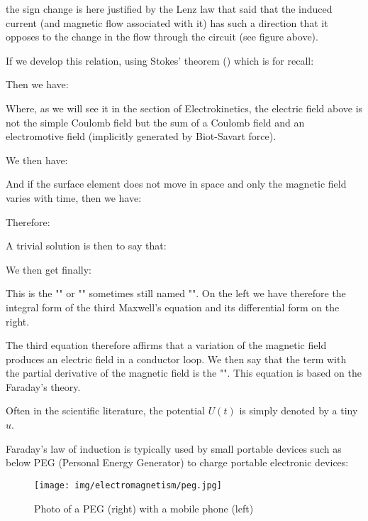 	the sign change is here justified by the Lenz law that said that the induced current (and magnetic flow associated with it) has such a direction that it opposes to the change in the flow through the circuit (see figure above).
	
	If we develop this relation, using Stokes' theorem () which is for recall:
	
	Then we have:
	
	Where, as we will see it in the section of Electrokinetics, the electric field above is not the simple Coulomb field but the sum of a Coulomb field and an electromotive field (implicitly generated by Biot-Savart force).
	
	We then have:
	
	And if the surface element does not move in space and only the magnetic field varies with time, then we have:
	
	Therefore:
	
	A trivial solution is then to say that:
	
	We then get finally:
	
	This is the "" or "" sometimes still named "". On the left we have therefore the integral form of the third Maxwell's equation and its differential form on the right.
	
	The third equation therefore affirms that a variation of the magnetic field produces an electric field in a conductor loop. We then say that the term with the partial derivative of the magnetic field is the "". This equation is based on the Faraday's theory.
	\begin{tcolorbox}[title=Remark,colframe=black,arc=10pt]
	Often in the scientific literature, the potential $U (t)$ is simply denoted by a tiny $u$.
	\end{tcolorbox}
	Faraday's law of induction is typically used by small portable devices such as below PEG (Personal Energy Generator) to charge portable electronic devices:
	\begin{figure}[H]
		\centering
		\texttt{[image: img/electromagnetism/peg.jpg]}
		\caption[Photo of a PEG with a mobile phone]{Photo of a PEG (right) with a mobile phone (left)}
	\end{figure}

